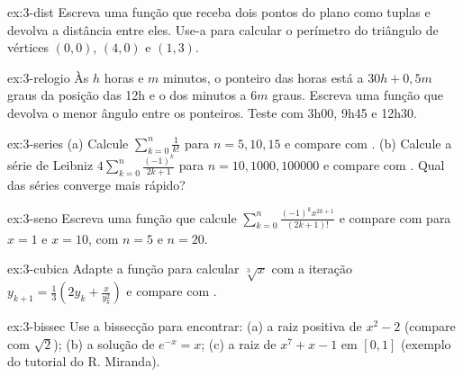 \begin{exercicio}{ex:3-dist}
Escreva uma função  que receba dois pontos do plano como tuplas e devolva a distância entre
eles. Use-a para calcular o perímetro do triângulo de vértices $(0,0)$, $(4,0)$ e $(1,3)$.
\end{exercicio}

\begin{exercicio}{ex:3-relogio}
Às $h$ horas e $m$ minutos, o ponteiro das horas está a $30h+0{,}5m$ graus da posição das 12h e o dos minutos a
$6m$ graus. Escreva uma função que devolva o menor ângulo entre os ponteiros. Teste com 3h00, 9h45 e 12h30.
\end{exercicio}

\begin{exercicio}[aproximando $e$ e $\pi$]{ex:3-series}
(a) Calcule $\sum_{k=0}^{n}\frac{1}{k!}$ para $n=5,10,15$ e compare com .
(b) Calcule a série de Leibniz $4\sum_{k=0}^{n}\frac{(-1)^k}{2k+1}$ para $n=10, 1000, 100000$ e compare com
. Qual das séries converge mais rápido?
\end{exercicio}

\begin{exercicio}{ex:3-seno}
Escreva uma função  que calcule $\displaystyle\sum_{k=0}^{n}\frac{(-1)^k x^{2k+1}}{(2k+1)!}$ e compare
com  para $x=1$ e $x=10$, com $n=5$ e $n=20$.
\end{exercicio}

\begin{exercicio}{ex:3-cubica}
Adapte a função  para calcular $\sqrt[3]{x}$ com a iteração $y_{k+1}=\frac{1}{3}\left(2y_k+\frac{x}{y_k^2}\right)$
e compare com .
\end{exercicio}

\begin{exercicio}{ex:3-bissec}
Use a bissecção para encontrar: (a) a raiz positiva de $x^2-2$ (compare com $\sqrt2$); (b) a solução de
$e^{-x}=x$; (c) a raiz de $x^7+x-1$ em $[0,1]$ (exemplo do tutorial do R. Miranda).
\end{exercicio}
